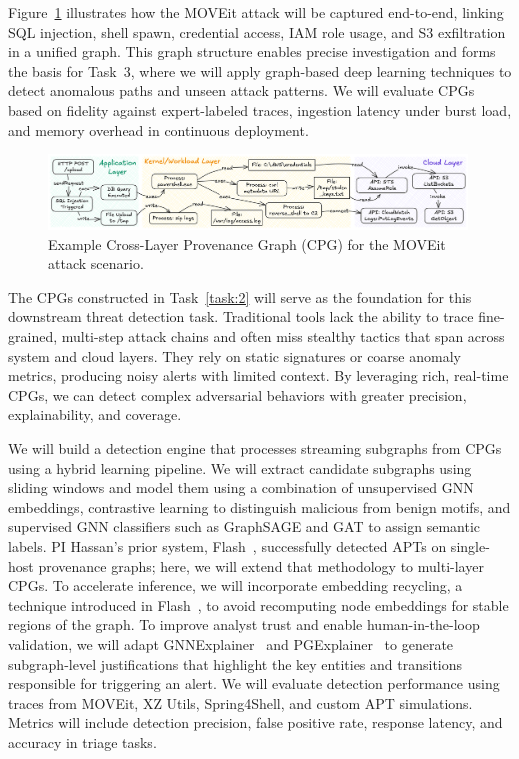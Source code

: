 Figure~\ref{fig:example:cpg} illustrates how the MOVEit attack will be captured end-to-end, linking SQL injection, shell spawn, credential access, IAM role usage, and S3 exfiltration in a unified graph. This graph structure enables precise investigation and forms the basis for Task~3, where we will apply graph-based deep learning techniques to detect anomalous paths and unseen attack patterns. We will evaluate CPGs based on fidelity against expert-labeled traces, ingestion latency under burst load, and memory overhead in continuous deployment.

\begin{figure}[t!]
    \centering \includegraphics[width=0.99\textwidth]{fig/graph-example.png}
    \caption{Example Cross-Layer Provenance Graph (CPG) for the MOVEit attack scenario.}
    \label{fig:example:cpg}
\end{figure}

 The CPGs constructed in Task~\ref{task:2} will serve as the foundation for this downstream threat detection task. Traditional tools lack the ability to trace fine-grained, multi-step attack chains and often miss stealthy tactics that span across system and cloud layers. They rely on static signatures or coarse anomaly metrics, producing noisy alerts with limited context. By leveraging rich, real-time CPGs, we can detect complex adversarial behaviors with greater precision, explainability, and coverage.

We will build a detection engine that processes streaming subgraphs from CPGs using a hybrid learning pipeline. We will extract candidate subgraphs using sliding windows and model them using a combination of unsupervised GNN embeddings, contrastive learning to distinguish malicious from benign motifs, and supervised GNN classifiers such as GraphSAGE and GAT to assign semantic labels. PI Hassan’s prior system, Flash~\cite{flash2024}, successfully detected APTs on single-host provenance graphs; here, we will extend that methodology to multi-layer CPGs. To accelerate inference, we will incorporate embedding recycling, a technique introduced in Flash~\cite{flash2024}, to avoid recomputing node embeddings for stable regions of the graph. To improve analyst trust and enable human-in-the-loop validation, we will adapt GNNExplainer~\cite{ying2019gnnexplainer} and PGExplainer~\cite{luo2020parameterized} to generate subgraph-level justifications that highlight the key entities and transitions responsible for triggering an alert. We will evaluate detection performance using traces from MOVEit, XZ Utils, Spring4Shell, and custom APT simulations. Metrics will include detection precision, false positive rate, response latency, and accuracy in triage tasks.
    
